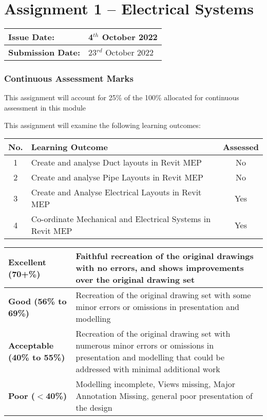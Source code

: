 


	
\part*{Assignment 1 – Electrical Systems}

\begin{tabularx}{\textwidth}{ |X|X| }
	\hline
	\textbf{Issue Date:} & 4$^{th}$ October 2022 \\
	\hline 
	\textbf{Submission Date:}  & 23$^{rd}$ October 2022 \\
	\hline
\end{tabularx}


\section*{Continuous Assessment Marks}
This assignment will account for 25\% of the 100\% allocated for continuous assessment in this module

This assignment will examine the following learning outcomes:\\

\begin{tabularx}{\textwidth}{ |c|X|c| }
	\hline
	\textbf{No.} & \textbf{Learning Outcome} & \textbf{Assessed} \\
	\hline 
	1  & Create and analyse Duct layouts in Revit MEP & No \\
	2  & Create and analyse Pipe Layouts in Revit MEP & No \\
	3  & Create and Analyse Electrical Layouts in Revit MEP & Yes \\
	4  & Co-ordinate Mechanical and Electrical Systems in Revit MEP & Yes \\
	\hline
\end{tabularx}

\vspace{1cm}

\begin{tabularx}{\textwidth}{ |l|X| }
	\hline 
	\textbf{Excellent (70+\%)} & Faithful recreation of the original drawings with no errors, and shows improvements over the original drawing set\\ 
	\hline
	\textbf{Good (56\% to 69\%)} & Recreation of the original drawing set with some minor errors or omissions in presentation and modelling \\
	\hline
	\textbf{Acceptable (40\% to 55\%)} & Recreation of the original drawing set with numerous minor errors or omissions in presentation and modelling that could be addressed with minimal additional work \\ 
	\hline
	\textbf{Poor ($<$40\%)} & Modelling incomplete, Views missing, Major Annotation Missing, general poor presentation of the design  \\
	\hline
\end{tabularx}

